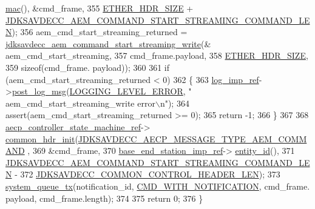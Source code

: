 \begin{DoxyCode}
      \hyperlink{classavdecc__lib_1_1end__station__imp_a08e1bd1861b3b8f447ea374a65ac11f9}{mac}(), &cmd\_frame,
355                                                         \hyperlink{namespaceavdecc__lib_a6c827b1a0d973e18119c5e3da518e65ca9512ad9b34302ba7048d88197e0a2dc0}{ETHER\_HDR\_SIZE} + 
      \hyperlink{group__command__start__streaming_ga64b3f37bb8a2701b0fa5255a96302231}{JDKSAVDECC\_AEM\_COMMAND\_START\_STREAMING\_COMMAND\_LEN});
356     aem\_cmd\_start\_streaming\_returned = 
      \hyperlink{group__command__start__streaming_ga7bd7788fdc598aee7b74a487c1a8e03a}{jdksavdecc\_aem\_command\_start\_streaming\_write}(&
      aem\_cmd\_start\_streaming,
357                                                                                     cmd\_frame.payload,
358                                                                                     
      \hyperlink{namespaceavdecc__lib_a6c827b1a0d973e18119c5e3da518e65ca9512ad9b34302ba7048d88197e0a2dc0}{ETHER\_HDR\_SIZE},
359                                                                                     \textcolor{keyword}{sizeof}(cmd\_frame.
      payload));
360 
361     \textcolor{keywordflow}{if} (aem\_cmd\_start\_streaming\_returned < 0)
362     \{
363         \hyperlink{namespaceavdecc__lib_acbe3e2a96ae6524943ca532c87a28529}{log\_imp\_ref}->\hyperlink{classavdecc__lib_1_1log_a68139a6297697e4ccebf36ccfd02e44a}{post\_log\_msg}(\hyperlink{namespaceavdecc__lib_a501055c431e6872ef46f252ad13f85cdaf2c4481208273451a6f5c7bb9770ec8a}{LOGGING\_LEVEL\_ERROR}, \textcolor{stringliteral}{"
      aem\_cmd\_start\_streaming\_write error\(\backslash\)n"});
364         assert(aem\_cmd\_start\_streaming\_returned >= 0);
365         \textcolor{keywordflow}{return} -1;
366     \}
367 
368     \hyperlink{namespaceavdecc__lib_a0b1b5aea3c0490f77cbfd9178af5be22}{aecp\_controller\_state\_machine\_ref}->
      \hyperlink{classavdecc__lib_1_1aecp__controller__state__machine_aafc737d7ed17a62fed9df6528f18d3ec}{common\_hdr\_init}(\hyperlink{group__aecp__message__type_ga4625ce189cc209f42deb0629f48faf69}{JDKSAVDECC\_AECP\_MESSAGE\_TYPE\_AEM\_COMMAND}
      ,
369                                                        &cmd\_frame,
370                                                        \hyperlink{classavdecc__lib_1_1descriptor__base__imp_a550c969411f5f3b69f55cc139763d224}{base\_end\_station\_imp\_ref}->
      \hyperlink{classavdecc__lib_1_1end__station__imp_a363b6c9664a0d701def9b17863e20ad3}{entity\_id}(),
371                                                        
      \hyperlink{group__command__start__streaming_ga64b3f37bb8a2701b0fa5255a96302231}{JDKSAVDECC\_AEM\_COMMAND\_START\_STREAMING\_COMMAND\_LEN} -
372                                                            
      \hyperlink{group__jdksavdecc__avtp__common__control__header_gaae84052886fb1bb42f3bc5f85b741dff}{JDKSAVDECC\_COMMON\_CONTROL\_HEADER\_LEN});
373     \hyperlink{namespaceavdecc__lib_a6dd511685627c0865a3442b539a4e8e9}{system\_queue\_tx}(notification\_id, \hyperlink{namespaceavdecc__lib_aabcadff06aa62be0ce47bc0646823604aba48b8a017e06fb240b650cdea965178}{CMD\_WITH\_NOTIFICATION}, cmd\_frame.
      payload, cmd\_frame.length);
374 
375     \textcolor{keywordflow}{return} 0;
376 \}
\end{DoxyCode}


